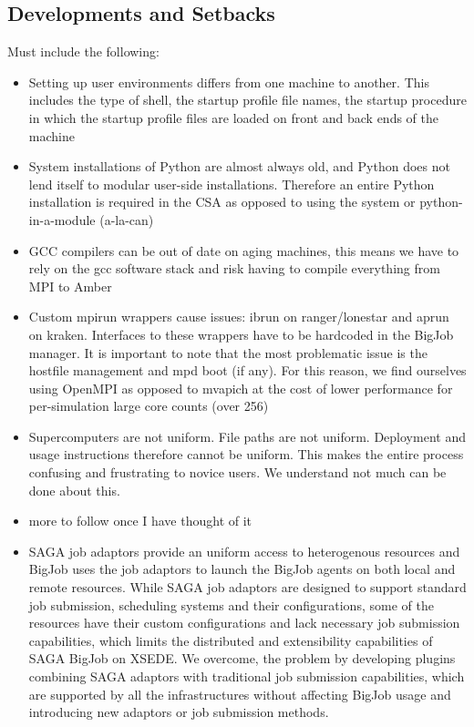 \documentclass{sig-alternate}
\begin{document}
\subsection{Developments and Setbacks}


 


Must include the following:
\begin{itemize}
 \item Setting up user environments differs from one machine to another. This
includes the type of shell, the startup profile file names, the startup
procedure in which the startup profile files are loaded on front and back ends
of the machine
 \item System installations of Python are almost always old, and Python does not
lend itself to modular user-side installations. Therefore an entire Python
installation is required in the CSA as opposed to using the system or
python-in-a-module (a-la-can)
 \item GCC compilers can be out of date on aging machines, this means we have
to rely on the gcc software stack and risk having to compile everything from MPI
to Amber
 \item Custom mpirun wrappers cause issues: ibrun on ranger/lonestar and aprun
on kraken. Interfaces to these wrappers have to be hardcoded in the BigJob
manager. It is important to note that the most problematic issue is the hostfile
management and mpd boot (if any). For this reason, we find ourselves using
OpenMPI as opposed to mvapich at the cost of lower performance for
per-simulation large core counts (over 256)
 \item Supercomputers are not uniform. File paths are not uniform. Deployment
and usage instructions therefore cannot be uniform. This makes the entire
process confusing and frustrating to novice users. We understand not much can
be done about this.
 \item more to follow once I have thought of it

\item SAGA job adaptors provide an uniform access to heterogenous resources and BigJob uses the job adaptors 
to launch the BigJob agents on both local and remote resources. While SAGA job adaptors are designed to support 
standard job submission, scheduling systems and their configurations, some of the resources have their custom 
configurations and lack necessary job submission capabilities, which limits the distributed and extensibility capabilities 
of SAGA BigJob on XSEDE. We overcome, the problem by developing plugins combining SAGA adaptors with traditional 
job submission capabilities, which are supported by all the infrastructures without affecting BigJob usage and introducing 
new adaptors or job submission methods. 


\end{itemize}
\end{document}
